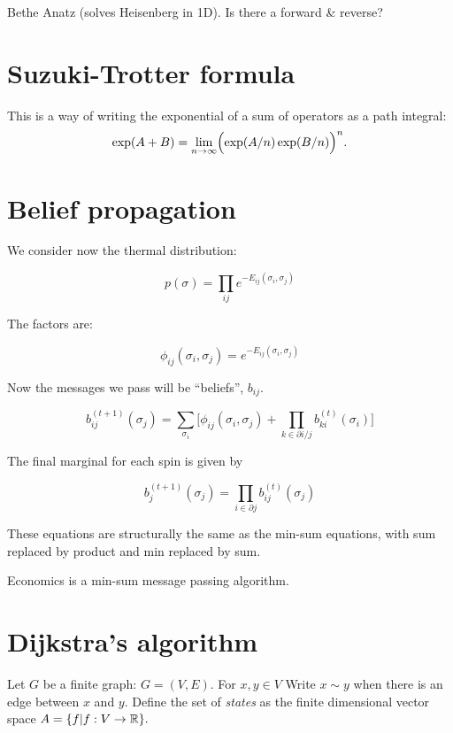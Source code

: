\documentclass[11pt]{article}
\begin{document}
Bethe Anatz (solves Heisenberg in 1D). 
Is there a forward \& reverse?

\section{Suzuki-Trotter formula}

This is a way of writing the exponential of a sum of operators
as a path integral:
$$
\exp(A+B) = \lim_{n\to\infty} \Bigl(\exp(A/n)\exp(B/n)\Bigr)^n.
$$
 

\section{Belief propagation}



We consider now the thermal distribution:

$$
    p(\sigma) = \prod_{ij} e^{-E_{ij}(\sigma_i, \sigma_j)}
$$

The factors are:

$$
\phi_{ij}(\sigma_i, \sigma_j) = e^{-E_{ij}(\sigma_i, \sigma_j)}
$$

Now the messages we pass will be ``beliefs'', $b_{ij}$.

$$
b_{ij}^{(t+1)}(\sigma_j) = \sum_{\sigma_i}\bigl[ \phi_{ij}(\sigma_i, \sigma_j)
  + \prod_{k\in \partial i/j} b_{ki}^{(t)}(\sigma_i) \bigr]
$$

The final marginal for each spin is given by

$$
    b_j^{(t+1)}(\sigma_j) = \prod_{i\in \partial j} b_{ij}^{(t)}(\sigma_j)
$$

These equations are structurally the same as the
min-sum equations, with sum replaced by product and
min replaced by sum.




Economics is a min-sum message passing algorithm.


%
%

\section{Dijkstra's algorithm}

Let $G$ be a finite graph: $G = (V, E).$
For $x,y\in V$ Write $x\sim y$ when there
is an edge between $x$ and $y.$ %
Define the set of \emph{states} as %
the finite dimensional vector space
$A = \{ f | f : V \to \mathbb R \}.$
\end{document}
